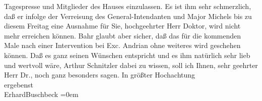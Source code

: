 \begin{ledgroupsized}[t]{13cm}
               Tagespresse und Mitglieder des Hauses einzulassen. Es ist ihm sehr schmerzlich, daß
               er infolge der Verreisung des General-Intendanten und Major Michels bis zu diesem Freitag eine Ausnahme für Sie,
               hochgeehrter Herr Doktor, wird nicht mehr erreichen können. Bahr glaubt aber sicher, daß das für die kommenden Male nach
               einer Intervention bei Exc. Andrian ohne
               weiteres wird geschehen können. Daß es ganz seinen Wünschen entspricht und es ihm
               natürlich sehr lieb \introOben{}und wertvoll\introOben{} wäre, Arthur Schnitzler
               dabei zu wissen, soll ich Ihnen, sehr geehrter Herr Dr., noch ganz besonders
               sagen.\pend
           \pstart
           In größter Hochachtung{\\[\baselineskip]}ergebenst{\\[\baselineskip]}\spacefill\mbox{ErhardBuschbeck}\pend
           \leftskip=0em{}
         
         \endnumbering{}\end{ledgroupsized}  \newcommand{\dateiname}{L02305}\newcommand{\titel}{Erhard Buschbeck an Arthur Schnitzler, 24. 9. 1918}\newcommand{\editorInnen}{ Martin Anton Müller und Gerd-Hermann Susen}
      